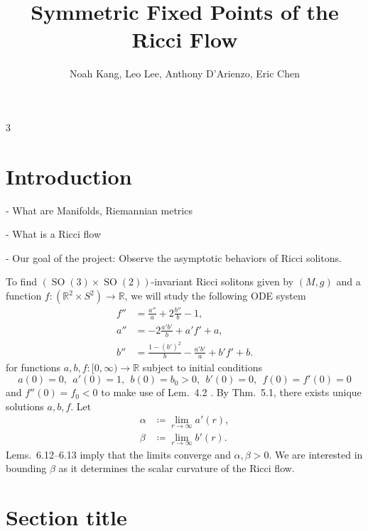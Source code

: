 \documentclass[landscape]{sciposter}
\title{Symmetric Fixed Points of the Ricci Flow}
\author{Noah Kang, Leo Lee, Anthony D'Arienzo, Eric Chen}
\newcommand{\R}{\mathbb{R}}
\newcommand{\SO}{\operatorname{SO}}
\begin{document}

\maketitle
\vspace{-3ex}
\begin{multicols}{3}  %


\section{Introduction}

- What are Manifolds, Riemannian metrics

- What is a Ricci flow

- Our goal of the project: Observe the asymptotic behaviors of Ricci solitons.

To find $(\SO(3) \times \SO(2))$-invariant Ricci solitons given by $(M, g)$ and a function $f: (\R^2 \times S^2) \to \R$, we will study the following ODE system \cite[Eqs.~(2.1)--(2.3)]{Rajan}
\begin{align}
    f'' &= \frac{a''}{a} + 2 \frac{b''}{b} - 1, \label{eq:rajan21} \\
    a'' &= -2 \frac{a'b'}{b} + a'f' + a, \label{eq:rajan22} \\
    b'' &= \frac{1 - (b')^2}{b} - \frac{a'b'}{a} + b'f' + b. \label{eq:rajan23}
\end{align}
for functions $a,b,f: [0, \infty) \to \R$ subject to initial conditions \cite[Lem.~2.1]{Rajan}
\[
    a(0) = 0,\ \ a'(0) = 1,\ \ b(0) = b_0 > 0,\ \ b'(0) = 0,\ \ f(0) = f'(0) = 0
\]
and $f''(0) = f_0 < 0$ to make use of Lem.~4.2 \cite{Rajan}. By Thm.~5.1, there exists unique solutions $a,b,f$. Let
\begin{align*}
    \alpha &\coloneq \lim_{r \to \infty} a'(r), \\
    \beta &\coloneq \lim_{r \to \infty} b'(r).
\end{align*}
Lems.~6.12--6.13 imply that the limits converge and $\alpha, \beta > 0$. We are interested in bounding $\beta$ as it determines the scalar curvature of the Ricci flow.

\section{Section title}


\end{multicols}
\end{document}
